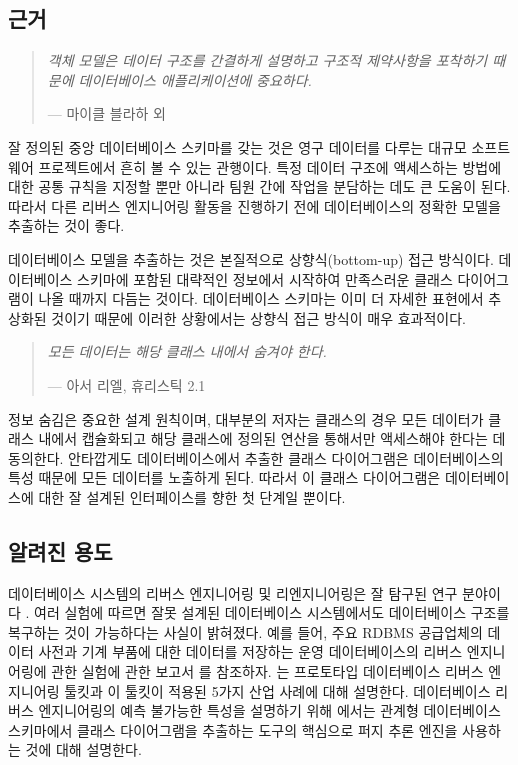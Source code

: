 \documentclass[a4paper,10pt,twoside]{book}
\begin{document}
\subsection*{근거}

\begin{quotation}
\noindent
\emph{객체 모델은 데이터 구조를 간결하게 설명하고 구조적 제약사항을 포착하기 때문에 데이터베이스 애플리케이션에 중요하다. }

\hfill --- 마이클 블라하 외  \cite{Blah98a} 
\end{quotation}

잘 정의된 중앙 데이터베이스 스키마를 갖는 것은 영구 데이터를 다루는 대규모 소프트웨어 프로젝트에서 흔히 볼 수 있는 관행이다. 특정 데이터 구조에 액세스하는 방법에 대한 공통 규칙을 지정할 뿐만 아니라 팀원 간에 작업을 분담하는 데도 큰 도움이 된다. 따라서 다른 리버스 엔지니어링 활동을 진행하기 전에 데이터베이스의 정확한 모델을 추출하는 것이 좋다.

데이터베이스 모델을 추출하는 것은 본질적으로 상향식(bottom-up) 접근 방식이다. 데이터베이스 스키마에 포함된 대략적인 정보에서 시작하여 만족스러운 클래스 다이어그램이 나올 때까지 다듬는 것이다. 데이터베이스 스키마는 이미 더 자세한 표현에서 추상화된 것이기 때문에 이러한 상황에서는 상향식 접근 방식이 매우 효과적이다.

\begin{quotation}
\noindent
\emph{모든 데이터는 해당 클래스 내에서 숨겨야 한다.}

\hfill --- 아서 리엘, 휴리스틱 2.1 \cite{Riel96a}
\end{quotation}

정보 숨김은 중요한 설계 원칙이며, 대부분의 저자는 클래스의 경우 모든 데이터가 클래스 내에서 캡슐화되고 해당 클래스에 정의된 연산을 통해서만 액세스해야 한다는 데 동의한다. 안타깝게도 데이터베이스에서 추출한 클래스 다이어그램은 데이터베이스의 특성 때문에 모든 데이터를 노출하게 된다. 따라서 이 클래스 다이어그램은 데이터베이스에 대한 잘 설계된 인터페이스를 향한 첫 단계일 뿐이다.

\subsection*{알려진 용도}

데이터베이스 시스템의 리버스 엔지니어링 및 리엔지니어링은 잘 탐구된 연구 분야이다 \cite{Arno92a} \cite{Mull00a}. 여러 실험에 따르면 잘못 설계된 데이터베이스 시스템에서도 데이터베이스 구조를 복구하는 것이 가능하다는 사실이 밝혀졌다. 예를 들어, 주요 RDBMS 공급업체의 데이터 사전과 기계 부품에 대한 데이터를 저장하는 운영 데이터베이스의 리버스 엔지니어링에 관한 실험에 관한 보고서 \cite{Prem94a}를 참조하자. \cite{Hain96a}는 프로토타입 데이터베이스 리버스 엔지니어링 툴킷과 이 툴킷이 적용된 5가지 산업 사례에 대해 설명한다. 데이터베이스 리버스 엔지니어링의 예측 불가능한 특성을 설명하기 위해 \cite{Jahn97b}에서는 관계형 데이터베이스 스키마에서 클래스 다이어그램을 추출하는 도구의 핵심으로 퍼지 추론 엔진을 사용하는 것에 대해 설명한다.
\end{document}
